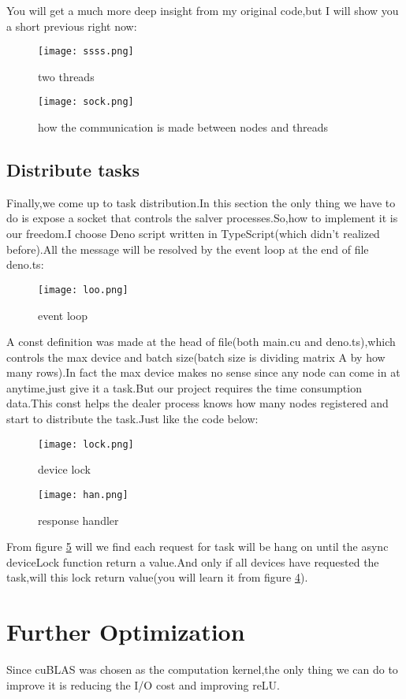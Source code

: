 \documentclass[12pt]{scrartcl} %
\begin{document}
You will get a much more deep insight from my original code,but I will show you a short previous right now:
\begin{figure}[H]
    \centering
    \texttt{[image: ssss.png]}
    \caption{two threads}
    \label{}
\end{figure}
\begin{figure}[H]
    \centering
    \texttt{[image: sock.png]}
    \caption{how the communication is made between nodes and threads}
    \label{}
\end{figure}
\subsection{Distribute tasks}
Finally,we come up to task distribution.In this section the only thing we have to do is expose a socket that controls the salver processes.So,how to implement it is our freedom.I choose Deno script written in TypeScript(which didn't realized before).All the message will be resolved by the event loop at the end of file deno.ts:
\begin{figure}[H]
    \centering
    \texttt{[image: loo.png]}
    \caption{event loop}
    \label{}
\end{figure}

A const definition was made at the head of file(both main.cu and deno.ts),which controls the max device and batch size(batch size is dividing matrix A by how many rows).In fact the max device makes no sense since any node can come in at anytime,just give it a task.But our project requires the time consumption data.This const helps the dealer process knows how many nodes registered and start to distribute the task.Just like the code below:
\begin{figure}[H]
    \centering
    \texttt{[image: lock.png]}
    \caption{device lock}
    \label{dd}
\end{figure}
\begin{figure}[H]
    \centering
    \texttt{[image: han.png]}
    \caption{response handler}
    \label{rr}
\end{figure}
From figure \ref{rr} will we find each request for task will be hang on until the async deviceLock function return a value.And only if all devices have requested the task,will this lock return value(you will learn it from figure \ref{dd}).
\section{Further Optimization}
Since cuBLAS was chosen as the computation kernel,the only thing we can do to improve it is reducing the I/O cost and improving reLU.
\end{document}
